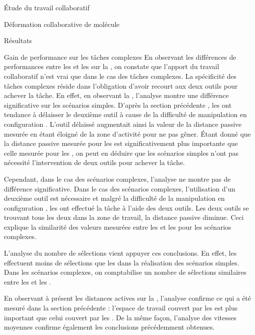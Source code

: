 \documentclass[myfrancais]{mythesis}
\begin{document}
\begin{mypart}{Étude du travail collaboratif}
\begin{mychapter}{Déformation collaborative de molécule}
\begin{mysection}{Résultats}
\begin{mysubsection}{Gain de performance sur les tâches complexes}
					En observant les différences de performances entre les  et les  sur la , on constate que l'apport du travail collaboratif n'est vrai que dans le cas des tâches complexes.
					La spécificité des tâches complexes réside dans l'obligation d'avoir recourt aux deux outils pour achever la tâche.
					En effet, en observant la , l'analyse montre une différence significative sur les scénarios simples.
					D'après la section précédente , les  ont tendance à délaisser le deuxième outil à cause de la difficulté de manipulation en configuration .
					L'outil délaissé augmentait ainsi la valeur de la distance passive mesurée en étant éloigné de la zone d'activité pour ne pas gêner.
					Étant donné que la distance passive mesurée pour les  est significativement plus importante que celle mesurée pour les , on peut en déduire que les scénarios simples n'ont pas nécessité l'intervention de deux outils pour achever la tâche.

					Cependant, dans le cas des scénarios complexes, l'analyse ne montre pas de différence significative.
					Dans le cas des scénarios complexes, l'utilisation d'un deuxième outil est nécessaire et malgré la difficulté de la manipulation en configuration , les  ont effectué la tâche à l'aide des deux outils.
					Les deux outils se trouvant tous les deux dans la zone de travail, la distance passive diminue.
					Ceci explique la similarité des valeurs mesurées entre les  et les  pour les scénarios complexes.

					L'analyse du nombre de sélections vient appuyer ces conclusions.
					En effet, les  effectuent moins de sélections que les  dans la réalisation des scénarios simples.
					Dans les scénarios complexes, on comptabilise un nombre de sélections similaires entre les  et les .

					En observant à présent les distances actives sur la , l'analyse confirme ce qui a été mesuré dans la section précédente  : l'espace de travail couvert par les  est plus important que celui couvert par les .
					De la même façon, l'analyse des vitesses moyennes confirme également les conclusions précédemment obtenues.


\end{mysubsection}
\end{mysection}
\end{mychapter}
\end{mypart}
\end{document}

